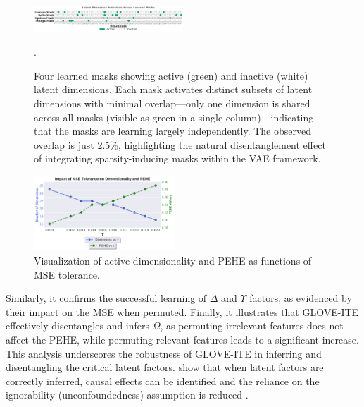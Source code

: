 \documentclass[doubleblind]{ecai}
\begin{document}
	\begin{figure}[h]
		\centering
		
		\includegraphics[width=0.5\textwidth]{Images/orthogonal.png}
		
		\caption{Four learned masks showing active (green) and inactive (white) latent dimensions. Each mask activates distinct subsets of latent dimensions with minimal overlap—only one dimension is shared across all masks (visible as green in a single column)—indicating that the masks are learning largely independently. The observed overlap is just 2.5\%, highlighting the natural disentanglement effect of integrating sparsity-inducing masks within the VAE framework.}
		
		.
		
		
		\label{fig:ortho}
		
	\end{figure}
	
	\begin{figure}[h]
		\centering
		
		\includegraphics[width=0.47\textwidth]{Images/tol_vs_dims_pehe.png}
		
		
		
		\caption{Visualization of active dimensionality and PEHE as functions of MSE tolerance.}
		
		\label{fig:tolerance}
		
	\end{figure}
	
	Similarly, it confirms the successful learning of $\Delta$ and $\Upsilon$ factors, as evidenced by their impact on the MSE when permuted. Finally, it illustrates that GLOVE-ITE effectively disentangles and infers $\Omega$, as permuting irrelevant features does not affect the PEHE, while permuting relevant features leads to a significant increase. This analysis underscores the robustness of GLOVE-ITE in inferring and disentangling the critical latent factors. \citet{CEVAE,lowe2022amortized} show that when latent factors are correctly inferred, causal effects can be identified and the reliance on the ignorability (unconfoundedness) assumption is reduced \citep{vowels2021targeted}.
	
\end{document}
